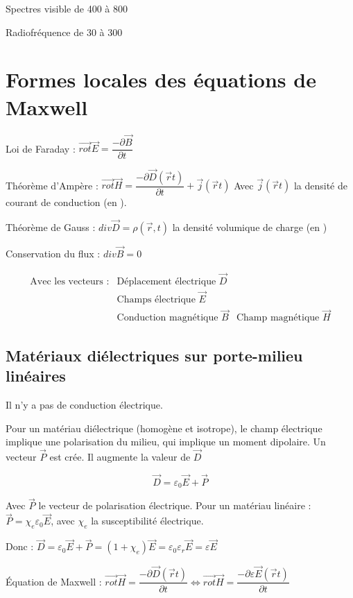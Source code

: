 \documentclass[12pt,a4paper]{report}
\begin{document}
Spectres visible de \unit{400}{\nano\meter} à \unit{800}{\nano\meter}

Radiofréquence de \unit{30}{\kilo\hertz} à \unit{300}{\giga\hertz}

\section{Formes locales des équations de Maxwell}

Loi de Faraday : \(\vec{rot} \vec{E} = \dfrac{-\partial \vec{B}}{\partial t}\)

Théorème d'Ampère : \(\vec{rot} \vec{H} = \dfrac{-\partial \vec{D}(\vec{r}t)}{\partial t} + \vec{j}(\vec{r}t)\) Avec \(\vec{j}(\vec{r}t)\) la densité de courant de conduction (en \unit{}{\ampere\per \meter\squared}).

Théorème de Gauss : \(div \vec{D} = \rho(\vec{r},t)\) la densité volumique de charge (en \unit{}{\coulomb \per \meter\cubed})

Conservation du flux : \(div \vec{B} = 0\)

\begin{align*}
	\text{Avec les vecteurs :}& \text{Déplacement électrique } \vec{D}\\
	& \text{Champs électrique } \vec{E}\\
	& \text{Conduction magnétique } \vec{B}
	& \text{Champ magnétique } \vec{H}
\end{align*}

\subsection{Matériaux diélectriques sur porte-milieu linéaires}

Il n'y a pas de conduction électrique.

Pour un matériau diélectrique (homogène et isotrope), le champ électrique implique une polarisation du milieu, qui implique un moment dipolaire. Un vecteur \(\vec{P}\) est crée. Il augmente la valeur de \(\vec{D}\)

\[
	\vec{D} = \varepsilon_0 \vec{E} + \vec{P}
\]

Avec \(\vec{P}\) le vecteur de polarisation électrique.
Pour un matériau linéaire : \(\vec{P} = \chi_e \varepsilon_0 \vec{E}\), avec \(\chi_e\) la susceptibilité électrique.

Donc : \(\vec{D} = \varepsilon_0 \vec{E} + \vec{P} = (1 + \chi_e) \vec{E} = \varepsilon_0 \varepsilon_r \vec{E} = \varepsilon \vec{E}\)

Équation de Maxwell : \(\vec{rot} \vec{H} = \dfrac{-\partial \vec{D}(\vec{r}t)}{\partial t} \Leftrightarrow \vec{rot} \vec{H} = \dfrac{-\partial \varepsilon \vec{E}(\vec{r}t)}{\partial t}\)
\end{document}
